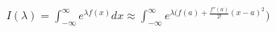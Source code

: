 \documentclass[preview]{standalone}
\begin{document}
\begin{align*}
I(\lambda) = \displaystyle \int_{-\infty}^{\infty} e^{\lambda f(x)} dx \approx  \int_{-\infty}^{\infty} e^{\lambda (f(a) + \frac{f''(a)}{2!}(x - a)^2})
\end{align*}
\end{document}
